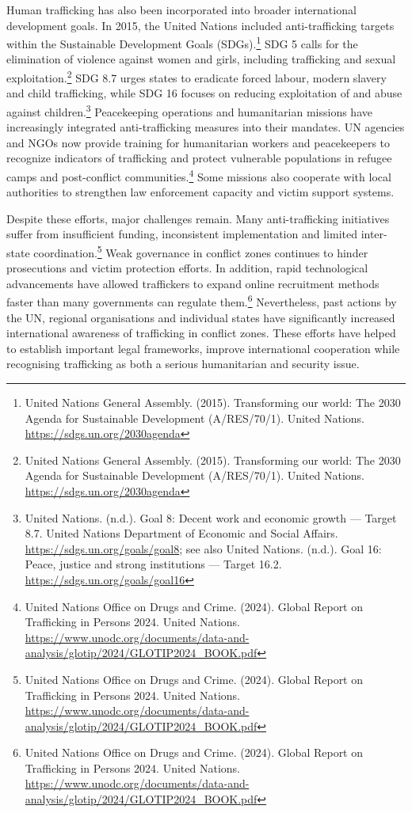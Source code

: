 Human trafficking has also been incorporated into broader international development goals. In 2015, the United Nations included anti-trafficking targets within the Sustainable Development Goals (SDGs).\footnote{United Nations General Assembly. (2015). Transforming our world: The 2030 Agenda for Sustainable Development (A/RES/70/1). United Nations. \url{https://sdgs.un.org/2030agenda}} SDG 5 calls for the elimination of violence against women and girls, including trafficking and sexual exploitation.\footnote{United Nations General Assembly. (2015). Transforming our world: The 2030 Agenda for Sustainable Development (A/RES/70/1). United Nations. \url{https://sdgs.un.org/2030agenda}} SDG 8.7 urges states to eradicate forced labour, modern slavery and child trafficking, while SDG 16 focuses on reducing exploitation of and abuse against children.\footnote{United Nations. (n.d.). Goal 8: Decent work and economic growth — Target 8.7. United Nations Department of Economic and Social Affairs. \url{https://sdgs.un.org/goals/goal8}; see also United Nations. (n.d.). Goal 16: Peace, justice and strong institutions — Target 16.2. \url{https://sdgs.un.org/goals/goal16}} Peacekeeping operations and humanitarian missions have increasingly integrated anti-trafficking measures into their mandates. UN agencies and NGOs now provide training for humanitarian workers and peacekeepers to recognize indicators of trafficking and protect vulnerable populations in refugee camps and post-conflict communities.\footnote{United Nations Office on Drugs and Crime. (2024). Global Report on Trafficking in Persons 2024. United Nations. \url{https://www.unodc.org/documents/data-and-analysis/glotip/2024/GLOTIP2024_BOOK.pdf}} Some missions also cooperate with local authorities to strengthen law enforcement capacity and victim support systems.

Despite these efforts, major challenges remain. Many anti-trafficking initiatives suffer from insufficient funding, inconsistent implementation and limited inter-state coordination.\footnote{United Nations Office on Drugs and Crime. (2024). Global Report on Trafficking in Persons 2024. United Nations. \url{https://www.unodc.org/documents/data-and-analysis/glotip/2024/GLOTIP2024_BOOK.pdf}} Weak governance in conflict zones continues to hinder prosecutions and victim protection efforts. In addition, rapid technological advancements have allowed traffickers to expand online recruitment methods faster than many governments can regulate them.\footnote{United Nations Office on Drugs and Crime. (2024). Global Report on Trafficking in Persons 2024. United Nations. \url{https://www.unodc.org/documents/data-and-analysis/glotip/2024/GLOTIP2024_BOOK.pdf}} Nevertheless, past actions by the UN, regional organisations and individual states have significantly increased international awareness of trafficking in conflict zones. These efforts have helped to establish important legal frameworks, improve international cooperation while recognising trafficking as both a serious humanitarian and security issue.

